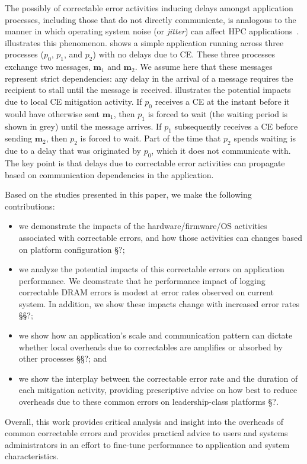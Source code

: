 The possibly of correctable error activities inducing delays amongst application
processes, including those that do not directly communicate, is analogous to the
manner in which operating system noise (or \emph{jitter}) can affect HPC
applications~\cite{Hoefler:2010:Characterizing, Ferreira:08:characterizing}.
 illustrates this phenomenon.   shows
a simple application running across three processes ($p_0$, $p_1$, and $p_2$)
with no delays due to CE.  These three processes exchange two messages,
$\mathbf{m}_1$ and $\mathbf{m}_2$.  We assume here that these messages represent
strict dependencies: any delay in the arrival of a message requires the
recipient to stall until the message is received. 
illustrates the potential impacts due to local CE mitigation activity.  If $p_0$
receives a CE at the instant before it would have otherwise sent $\mathbf{m}_1$,
then $p_1$ is forced to wait (the waiting period is shown in grey) until the
message arrives.  If $p_1$ subsequently receives a CE before sending
$\mathbf{m}_2$, then $p_2$ is forced to wait.  Part of the time that $p_2$
spends waiting is due to a delay that was originated by $p_0$, which it does not
communicate with.  The key point is that delays due to correctable error
activities can propagate based on communication dependencies in the application.

Based on the studies presented in this paper, we make the following
contributions:

\begin{itemize}

\item we demonstrate the impacts of the hardware/firmware/OS activities
        associated with correctable errors, and how those activities can changes
        based on platform configuration \S{?};

\item we analyze the potential impacts of this correctable errors on application
        performance.  We deomstrate that he performance impact of logging
                correctable DRAM errors is modest at error rates observed on
                current system.  In addition, we show these impacts change with
                increased error rates \S\S{?};

\item we show how an application's scale and communication pattern can dictate
        whether local overheads due to correctables are amplifies or absorbed by
        other processes \S\S{?}; and

\item we show the interplay between the correctable error rate and the duration
        of each mitigation activity, providing prescriptive advice on how best
        to reduce overheads due to these common errors on leadership-class platforms
        \S{?}.

\end{itemize}

Overall, this work provides critical analysis and insight into the overheads of
common correctable errors and provides practical advice to users and systems
administrators in an effort to fine-tune performance to application and system
characteristics.
